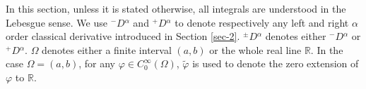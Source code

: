 \documentclass[leqno,final]{siamltex}
\numberwithin{equation}{section}
\newcommand{\Ome}{{\Omega}}
\renewcommand{\(}{\bigl(}
\renewcommand{\)}{\bigr)}
\newcommand{\R}{\mathbb{R}}
\begin{document}
 

In this section, unless it is stated otherwise, all integrals are understood in the Lebesgue sense. We use ${^{-}}{D}{^{\alpha}}$ and ${^{+}}{D}{^{\alpha}}$ to denote respectively any left and right $\alpha$ order classical derivative introduced in Section \ref{sec-2}. ${^{\pm}}{D}{^{\alpha}}$ denotes either ${^{-}}{D}{^{\alpha}}$ or ${^{+}}{D}{^{\alpha}}$. $\Omega$ denotes either a finite interval $(a,b)$ or the whole real line $\R$.  In the case $\Ome=(a,b)$, for any $\varphi \in C^{\infty}_{0}(\Omega)$, $\tilde{\varphi}$ is used to denote the zero extension of $\varphi$ to $\R$.

        
\end{document}
